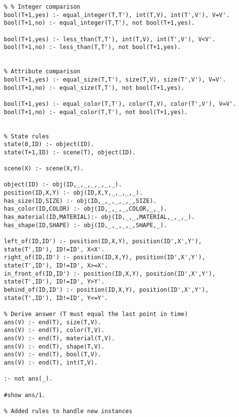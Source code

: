 \begin{lstlisting}
% % Integer comparison
bool(T+1,yes) :- equal_integer(T,T'), int(T,V), int(T',V'), V=V'.
bool(T+1,no) :- equal_integer(T,T'), not bool(T+1,yes).

bool(T+1,yes) :- less_than(T,T'), int(T,V), int(T',V'), V<V'.
bool(T+1,no) :- less_than(T,T'), not bool(T+1,yes).


% Attribute comparison
bool(T+1,yes) :- equal_size(T,T'), size(T,V), size(T',V'), V=V'.
bool(T+1,no) :- equal_size(T,T'), not bool(T+1,yes).

bool(T+1,yes) :- equal_color(T,T'), color(T,V), color(T',V'), V=V'.
bool(T+1,no) :- equal_color(T,T'), not bool(T+1,yes).


% State rules
state(0,ID) :- object(ID).
state(T+1,ID) :- scene(T), object(ID).

scene(X) :- scene(X,Y).

object(ID) :- obj(ID,_,_,_,_,_,_).
position(ID,X,Y) :- obj(ID,X,Y,_,_,_,_).
has_size(ID,SIZE) :- obj(ID,_,_,_,_,_,SIZE).
has_color(ID,COLOR) :- obj(ID,_,_,_,COLOR,_,_).
has_material(ID,MATERIAL):- obj(ID,_,_,MATERIAL,_,_,_).
has_shape(ID,SHAPE) :- obj(ID,_,_,_,_,SHAPE,_).

left_of(ID,ID') :- position(ID,X,Y), position(ID',X',Y'), state(T',ID'), ID!=ID', X<X'.
right_of(ID,ID') :- position(ID,X,Y), position(ID',X',Y'), state(T',ID'), ID!=ID', X>=X'.
in_front_of(ID,ID') :- position(ID,X,Y), position(ID',X',Y'), state(T',ID'), ID!=ID', Y>Y'.
behind_of(ID,ID') :- position(ID,X,Y), position(ID',X',Y'), state(T',ID'), ID!=ID', Y<=Y'.

% Derive answer (T must equal the last point in time)
ans(V) :- end(T), size(T,V).
ans(V) :- end(T), color(T,V).
ans(V) :- end(T), material(T,V).
ans(V) :- end(T), shape(T,V).
ans(V) :- end(T), bool(T,V).
ans(V) :- end(T), int(T,V).

:- not ans(_).

#show ans/1.

% Added rules to handle new instances

\end{lstlisting}

